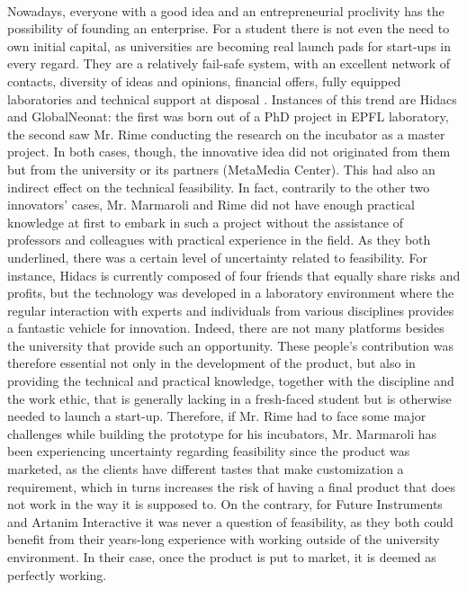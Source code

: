 \documentclass[twoside]{report}
\begin{document}
\paragraph{}
Nowadays, everyone with a good idea and an entrepreneurial proclivity has the possibility of founding an enterprise. For a student there is not even the need to own initial capital, as universities are becoming real launch pads for start-ups in every regard. They are a relatively fail-safe system, with an excellent network of contacts, diversity of ideas and opinions, financial offers, fully equipped laboratories and technical support at disposal \cite{stagars_university_2015}. Instances of this trend are Hidacs and GlobalNeonat: the first was born out of a PhD project in EPFL laboratory, the second saw Mr. Rime conducting the research on the incubator as a master project. In both cases, though, the innovative idea did not originated from them but from the university or its partners (MetaMedia Center). This had also an indirect effect on the technical feasibility. In fact, contrarily to the other two innovators' cases, Mr. Marmaroli and Rime did not have enough practical knowledge at first to embark in such a project without the assistance of professors and colleagues with practical experience in the field. As they both underlined, there was a certain level of uncertainty related to feasibility. For instance, Hidacs is currently composed of four friends that equally share risks and profits, but the technology was developed in a laboratory environment where the regular interaction with experts and individuals from various disciplines provides a fantastic vehicle for innovation. Indeed, there are not many platforms besides the university that provide such an opportunity. These people's contribution was therefore essential not only in the development of the product, but also in providing the technical and practical knowledge, together with the discipline and the work ethic, that is generally lacking in a fresh-faced student but is otherwise needed to launch a start-up. Therefore, if Mr. Rime had to face some major challenges while building the prototype for his incubators, Mr. Marmaroli has been experiencing uncertainty regarding feasibility since the product was marketed, as the clients have different tastes that make customization a requirement, which in turns increases the risk of having a final product that does not work in the way it is supposed to. On the contrary, for Future Instruments and Artanim Interactive it was never a question of feasibility, as they both could benefit from their years-long experience with working outside of the university environment. In their case, once the product is put to market, it is deemed as perfectly working.
\end{document}
